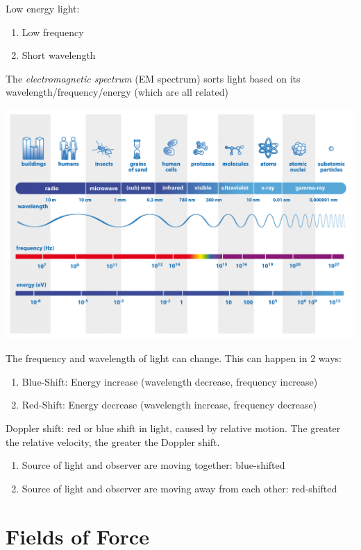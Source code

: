 \documentclass[12pt]{article}
\begin{document}
\noindent Low energy light:
	\begin{enumerate}
		\item Low frequency
		\item Short wavelength
	\end{enumerate}

The \textit{electromagnetic spectrum} (EM spectrum) sorts light based on its wavelength/frequency/energy (which are all related)

\begin{center}
\noindent\includegraphics[width=6in]{../images/emSpectrum.jpg}
\end{center}

The frequency and wavelength of light can change. This can happen in 2 ways:
\begin{enumerate}
	\item Blue-Shift: Energy increase (wavelength decrease, frequency increase)
	\item Red-Shift: Energy decrease (wavelength increase, frequency decrease)
\end{enumerate}

Doppler shift: red or blue shift in light, caused by relative motion. The greater the relative velocity, the greater the Doppler shift.
\begin{enumerate}
	\item Source of light and observer are moving together: blue-shifted
	\item Source of light and observer are moving away from each other: red-shifted
\end{enumerate}

\section{Fields of Force}
\end{document}
